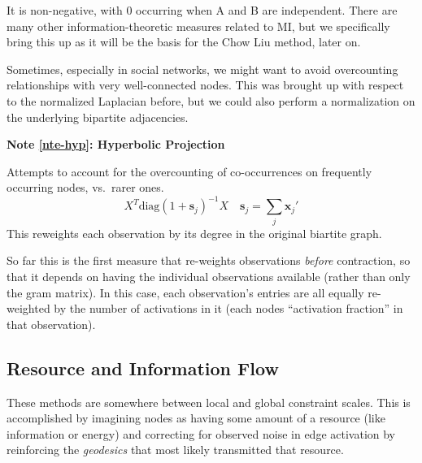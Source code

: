 \documentclass[%
	12pt,
		oneside,
		letterpaper
]{book}
\newcounter{quartocalloutnteno}
\newcommand{\quartocalloutnte}[1]{\refstepcounter{quartocalloutnteno}\label{#1}}
\begin{document}
It is non-negative, with 0 occurring when A and B are independent. There
are many other information-theoretic measures related to MI, but we
specifically bring this up as it will be the basis for the Chow Liu
method, later on.

Sometimes, especially in social networks, we might want to avoid
overcounting relationships with very well-connected nodes. This was
brought up with respect to the normalized Laplacian before, but we could
also perform a normalization on the underlying bipartite adjacencies.

\begin{tcolorbox}[enhanced jigsaw, opacityback=0, colback=white, breakable, rightrule=.15mm, leftrule=.75mm, arc=.35mm, colframe=quarto-callout-note-color-frame, bottomrule=.15mm, toprule=.15mm, left=2mm]

\quartocalloutnte{nte-hyp} 

\vspace{-3mm}\textbf{Note \ref*{nte-hyp}: Hyperbolic Projection}\vspace{3mm}

Attempts to account for the overcounting of co-occurrences on frequently
occurring nodes, vs.~rarer
ones.\autocite{Scientificcollaborationnetworks._Newman2001}
\[ X^T\text{diag}(1+\mathbf{s}_j)^{-1}X \quad \mathbf{s}_j = \sum_j{\mathbf{x}_j'}\]
This reweights each observation by its degree in the original biartite
graph.

\end{tcolorbox}

So far this is the first measure that re-weights observations
\emph{before} contraction, so that it depends on having the individual
observations available (rather than only the gram matrix). In this case,
each observation's entries are all equally re-weighted by the number of
activations in it (each nodes ``activation fraction'' in that
observation).

\subsection{Resource and Information
Flow}\label{resource-and-information-flow}

These methods are somewhere between local and global constraint scales.
This is accomplished by imagining nodes as having some amount of a
resource (like information or energy) and correcting for observed noise
in edge activation by reinforcing the \emph{geodesics} that most likely
transmitted that resource.
\end{document}
